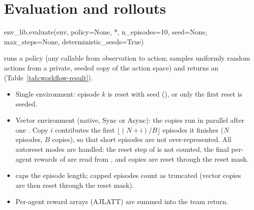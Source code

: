 \section{Evaluation and rollouts}\label{sec:workflow-evaluation}

\begin{pycode}
env_lib.evaluate(env, policy=None, *, n_episodes=10, seed=None,
                 max_steps=None, deterministic_seeds=True)
\end{pycode}
runs a policy (any callable from
observation to action;  samples uniformly random actions from a
private, seeded copy of the action space) and returns an
 (Table~\ref{tab:workflow-result}).
\begin{itemize}
  \item Single environment: episode $k$ is reset with seed 
        (), or only the first reset is seeded.
  \item Vector environment (native, Sync or Async): the copies run in parallel
        after one . Copy $i$ contributes the first
        $\lfloor (N + i) / B \rfloor$ episodes it finishes ($N$ episodes, $B$
        copies), so that short episodes are not over-represented. All autoreset
        modes are handled: the reset step of  is not counted,
        the final per-agent rewards of  are read from
        , and  copies are reset
        through the reset mask.
  \item {} caps the episode length; capped episodes count as
        truncated (vector copies are then reset through the reset mask).
  \item Per-agent reward arrays (AJLATT) are summed into the team return.
\end{itemize}

